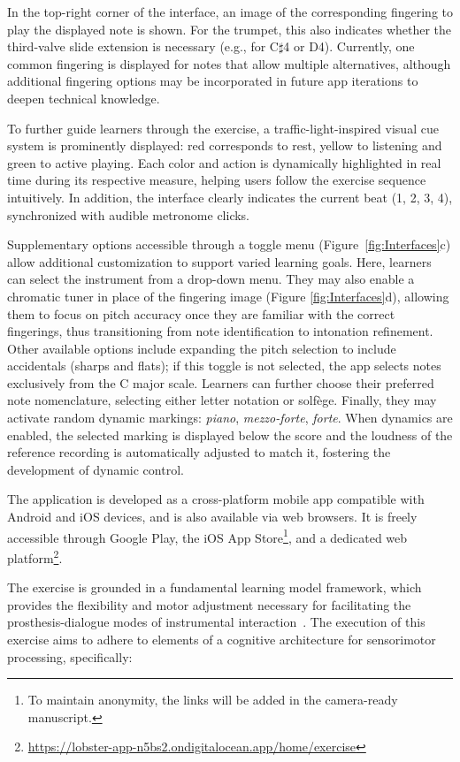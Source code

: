 \documentclass[runningheads]{llncs}
\begin{document}
In the top-right corner of the interface, an image of the corresponding fingering to play the displayed note is shown. For the trumpet, this also indicates whether the third-valve slide extension is necessary (e.g., for C$\sharp$4 or D4). Currently, one common fingering is displayed for notes that allow multiple alternatives, although additional fingering options may be incorporated in future app iterations to deepen technical knowledge.

To further guide learners through the exercise, a traffic-light-inspired visual cue system is prominently displayed: red corresponds to rest, yellow to listening and green to active playing. Each color and action is dynamically highlighted in real time during its respective measure, helping users follow the exercise sequence intuitively. In addition, the interface clearly indicates the current beat (1, 2, 3, 4), synchronized with audible metronome clicks.

Supplementary options accessible through a toggle menu (Figure~\ref{fig:Interfaces}c) allow additional customization to support varied learning goals. Here, learners can select the instrument from a drop-down menu. They may also enable a chromatic tuner in place of the fingering image (Figure \ref{fig:Interfaces}d), allowing them to focus on pitch accuracy once they are familiar with the correct fingerings, thus transitioning from note identification to intonation refinement. Other available options include expanding the pitch selection to include accidentals (sharps and flats); if this toggle is not selected, the app selects notes exclusively from the C major scale. Learners can further choose their preferred note nomenclature, selecting either letter notation or solfège. Finally, they may activate random dynamic markings: \textit{piano}, \textit{mezzo-forte}, \textit{forte}. When dynamics are enabled, the selected marking is displayed below the score and the loudness of the reference recording is automatically adjusted to match it, fostering the development of dynamic control.

The application is developed as a cross-platform mobile app compatible with Android and iOS devices, and is also available via web browsers. It is freely accessible through Google Play, the iOS App Store\footnote{To maintain anonymity, the links will be added in the camera-ready manuscript.}, and a dedicated web platform\footnote{\url{https://lobster-app-n5bs2.ondigitalocean.app/home/exercise}}.

The exercise is grounded in a fundamental learning model framework, which provides the flexibility and motor adjustment necessary for facilitating the prosthesis-dialogue modes of instrumental interaction~\cite{Leman17}. The execution of this exercise aims to adhere to elements of a cognitive architecture for sensorimotor processing, specifically:
\end{document}
